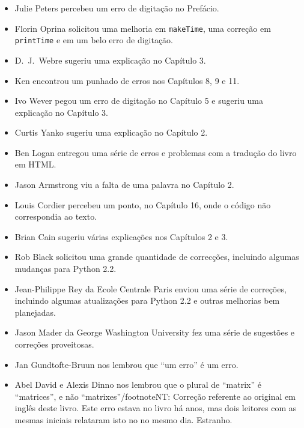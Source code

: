 \documentclass[10pt]{book}
\begin{document}
\begin {itemize}
\item Julie Peters percebeu um erro de digitação no Prefácio.

\item Florin Oprina solicitou uma melhoria em {\tt makeTime},
uma correção em {\tt printTime} e em um belo erro de digitação.

\item D.~J.~Webre sugeriu uma explicação no Capítulo 3.

\item Ken encontrou um punhado de erros nos Capítulos 8, 9 e 11.

\item Ivo Wever pegou um erro de digitação no Capítulo 5 e sugeriu uma explicação
no Capítulo 3.

\item Curtis Yanko sugeriu uma explicação no Capítulo 2.

\item Ben Logan entregou uma série de erros e problemas com a tradução
do livro em HTML.

\item Jason Armstrong viu a falta de uma palavra no Capítulo 2.

\item Louis Cordier percebeu um ponto, no Capítulo 16, onde o código
não correspondia ao texto.

\item Brian Cain sugeriu várias explicações nos Capítulos 2 e 3.

\item Rob Black solicitou uma grande quantidade de correcções, incluindo algumas
mudanças para Python 2.2.

\item Jean-Philippe Rey da Ecole Centrale
Paris enviou uma série de correções, incluindo algumas atualizações para Python 2.2
e outras melhorias bem planejadas.

\item Jason Mader da George Washington University fez uma série
de sugestões e correções proveitosas.

\item Jan Gundtofte-Bruun nos lembrou que ``um erro'' é um erro.

\item Abel David e Alexis Dinno nos lembrou que o plural de
``matrix'' é ``matrices'', e não ``matrixes''/footnote{NT: Correção referente ao original em inglês deste livro}. Este erro estava no
livro há anos, mas dois leitores com as mesmas iniciais relataram isto no
no mesmo dia. Estranho.


\end{itemize}
\end{document}
